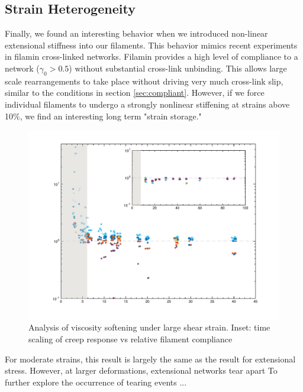 \documentclass[pre,reprint]{revtex4-1}
\begin{document}
\subsection{Strain Heterogeneity}
Finally, we found an interesting behavior when we introduced non-linear extensional stiffness into our filaments.  This behavior mimics recent experiments in filamin cross-linked networks.  Filamin provides a high level of compliance to a network ($\gamma_0>0.5$) without substantial cross-link unbinding.  This allows large scale rearrangements to take place without driving very much cross-link slip, similar to the conditions in section \ref{sec:compliant}.  However, if we force individual filaments to undergo a strongly nonlinear stiffening at strains above 10\%, we find an interesting long term "strain storage."

\begin{figure}[h!]
\centering
\includegraphics[width=\hsize]{eff_vic_master}
\caption{\label{fig:align}Analysis of viscosity softening under large shear strain. Inset: time scaling of creep response vs relative filament compliance  }
\end{figure}

For moderate strains, this result is largely the same as the result for extensional stress.  However, at larger deformations, extensional networks tear apart
To further explore the occurrence of tearing events ...
\end{document}
